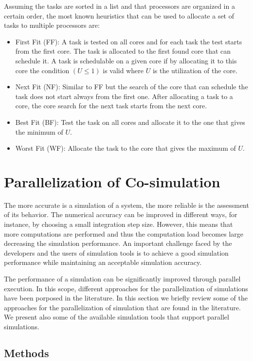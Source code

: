 Assuming the tasks are sorted in a list and that processors are organized in a certain order, the most known heuristics that can be used to allocate a set of tasks to multiple processors are:

\begin{itemize}
\item First Fit (FF): A task is tested on all cores and for each task the test starts from the first core. The task is allocated to the first found core that can schedule it. A task is schedulable on a given core if by allocating it to this core the condition $(U\leq1)$ is valid where $U$ is the utilization of the core.
\item Next Fit (NF): Similar to FF but the search of the core that can schedule the task does not start always from the first one. After allocating a task to a core, the core search for the next task starts from the next core.
\item Best Fit (BF): Test the task on all cores and allocate it to the one that gives the minimum of $U$.
\item Worst Fit (WF): Allocate the task to the core that gives the maximum of $U$.
\end{itemize}
  
\section{Parallelization of Co-simulation}

The more accurate is a simulation of a system, the more reliable is the assessment of its behavior. The numerical accuracy can be improved in different ways, for instance, by choosing a small integration step size. However, this means that more computations are performed and thus the computation load becomes large decreasing the simulation performance. An important challenge faced by the developers and the users of simulation tools is to achieve a good simulation performance while maintaining an acceptable simulation accuracy. 

The performance of a simulation can be significantly improved through parallel execution. In this scope, different approaches for the parallelization of simulations have been porposed in the literature. In this section we briefly review some of the approaches for the parallelization of simulation that are found in the literature. We present also some of the available simulation tools that support parallel simulations.

\subsection{Methods}

